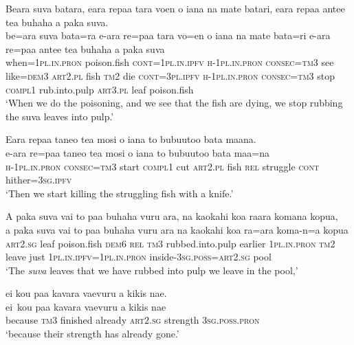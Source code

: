 \ea\label{ex:text29-13}
Beara suva batara, eara repaa tara voen o iana na mate batari, eara repaa antee tea buhaha a paka suva.\\
\gll be=ara	suva	bata=ra	e-ara	re=paa	tara	vo=en	o	iana	na	mate	bata=ri	e-ara	re=paa	antee	tea	buhaha	a	paka	suva\\
     when=1\textsc{pl}.\textsc{in}.\textsc{pron}	poison.fish	\textsc{cont}=1\textsc{pl}.\textsc{in}.\textsc{ipfv}	\textsc{h}-1\textsc{pl}.\textsc{in}.\textsc{pron}	\textsc{consec}=\textsc{tm}3	see	like=\textsc{dem}3	\textsc{art}2.\textsc{pl}	fish	\textsc{tm}2	die	\textsc{cont}=3\textsc{pl}.\textsc{ipfv}	\textsc{h}-1\textsc{pl}.\textsc{in}.\textsc{pron}	\textsc{consec}=\textsc{tm}3	stop	\textsc{compl}1	rub.into.pulp	\textsc{art}3.\textsc{pl}	leaf	poison.fish\\
\glt `When we do the poisoning, and we see that the fish are dying, we stop rubbing the suva leaves into pulp.'
\z

\ea\label{ex:text29-14}
Eara repaa taneo tea mosi o iana to bubuutoo bata maana.\\
\gll e-ara	re=paa	taneo	tea	mosi	o	iana	to	bubuutoo	bata	maa=na\\
     \textsc{h}-1\textsc{pl}.\textsc{in}.\textsc{pron}	\textsc{consec}=\textsc{tm}3	start	\textsc{compl}1	cut	\textsc{art}2.\textsc{pl}	fish	\textsc{rel}	struggle	\textsc{cont}	hither=3\textsc{sg}.\textsc{ipfv}\\
\glt `Then we start killing the struggling fish with a knife.'
\z

\ea\label{ex:text29-15}
A paka suva vai to paa buhaha vuru ara, na kaokahi koa raara komana kopua,\\
\gll a	paka	suva	vai	to	paa	buhaha	vuru	ara	na	kaokahi	koa	ra=ara	koma-n=a	kopua\\
     \textsc{art}2.\textsc{sg}	leaf	poison.fish	\textsc{dem}6	\textsc{rel}	\textsc{tm}3	rubbed.into.pulp	earlier	1\textsc{pl}.\textsc{in}.\textsc{pron}	\textsc{tm}2	leave	just	1\textsc{pl}.\textsc{in}.\textsc{ipfv}=1\textsc{pl}.\textsc{in}.\textsc{pron}	inside-3\textsc{sg}.\textsc{poss}=\textsc{art}2.\textsc{sg}	pool\\
\glt `The \textit{suva} leaves that we have rubbed into pulp we leave in the pool,'
\z

\ea\label{ex:text29-16}
ei kou paa kavara vaevuru a kikis nae.\\
\gll ei~kou	paa	kavara	vaevuru	a	kikis	nae\\
     because	\textsc{tm}3	finished	already	\textsc{art}2.\textsc{sg}	strength	3\textsc{sg}.\textsc{poss}.\textsc{pron}\\
\glt `because their strength has already gone.'
\z

